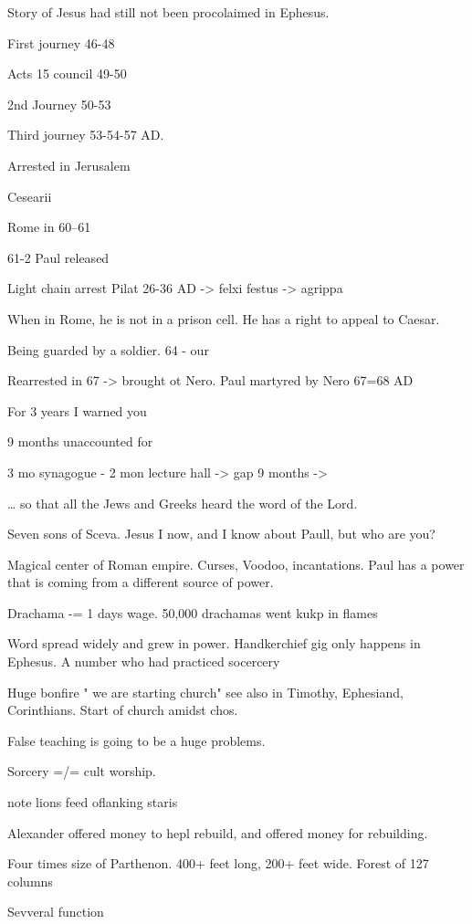 \documentclass[
]{book}
\begin{document}
Story of Jesus had still not been procolaimed in Ephesus.

First journey 46-48

Acts 15 council 49-50

2nd Journey 50-53

Third journey 53-54-57 AD.

Arrested in Jerusalem

Cesearii

Rome in 60--61

61-2 Paul released

Light chain arrest Pilat 26-36 AD -\textgreater{} felxi festus -\textgreater{} agrippa

When in Rome, he is not in a prison cell. He has a right to appeal to Caesar.

Being guarded by a soldier. 64 - our

Rearrested in 67 -\textgreater{} brought ot Nero. Paul martyred by Nero 67=68 AD

For 3 years I warned you

9 months unaccounted for

3 mo synagogue - 2 mon lecture hall -\textgreater{} gap 9 months -\textgreater{}

\ldots{} so that all the Jews and Greeks heard the word of the Lord.

Seven sons of Sceva. Jesus I now, and I know about Paull, but who are you?

Magical center of Roman empire. Curses, Voodoo, incantations. Paul has a power that is coming from a different source of power.

Drachama -= 1 days wage. 50,000 drachamas went kukp in flames

Word spread widely and grew in power. Handkerchief gig only happens in Ephesus. A number who had practiced socercery

Huge bonfire " we are starting church" see also in Timothy, Ephesiand, Corinthians. Start of church amidst chos.

False teaching is going to be a huge problems.

Sorcery =/= cult worship.

note lions feed oflanking staris

Alexander offered money to hepl rebuild, and offered money for rebuilding.

Four times size of Parthenon. 400+ feet long, 200+ feet wide. Forest of 127 columns

Sevveral function
\end{document}
